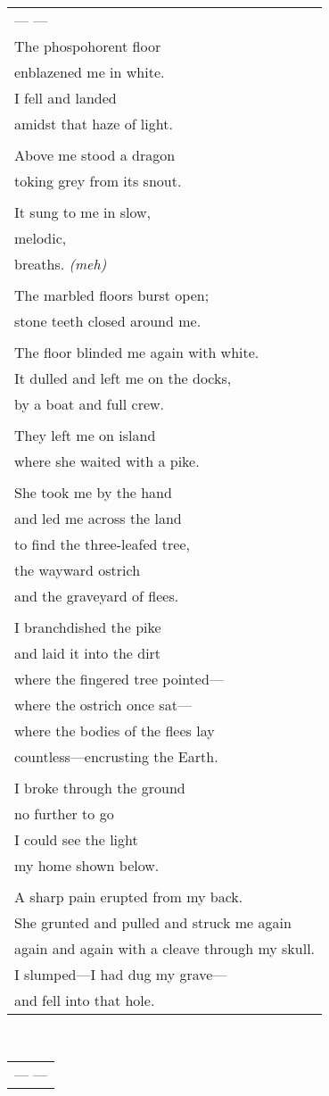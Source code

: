 \documentclass{article}
\begin{document}
\begin{tabular}{l}
\\
--- --- \\
The phospohorent floor \\
enblazened me in white. \\
I fell and landed \\
amidst that haze of light. \\
\\
Above me stood a dragon \\
toking grey from its snout. \\
\\
It sung to me in slow, \\
melodic, \\
breaths. \h\textit{(meh)}\\
\\
The marbled floors burst open; \\
stone teeth closed around me. \\
\\
The floor blinded me again with white. \\
It dulled and left me on the docks, \\
by a boat and full crew. \\
\\
They left me on island \\
where she waited with a pike. \\
\\
She took me by the hand \\
and led me across the land \\
to find the three-leafed tree, \\
the wayward ostrich \\
and the graveyard of flees. \\
\\
I branchdished the pike \\
and laid it into the dirt \\
where the fingered tree pointed--- \\
where the ostrich once sat--- \\
where the bodies of the flees lay \\
countless---encrusting the Earth. \\
\\
I broke through the ground \\
no further to go \\
I could see the light \\
my home shown below. \\
\\
A sharp pain erupted from my back. \\
She grunted and pulled and struck me again \\
again and again with a cleave through my skull. \\
I slumped---I had dug my grave--- \\
and fell into that hole. \\
\end{tabular} \\
\begin{tabular}{l}
\\
--- --- \\
\end{tabular}
\end{document}
